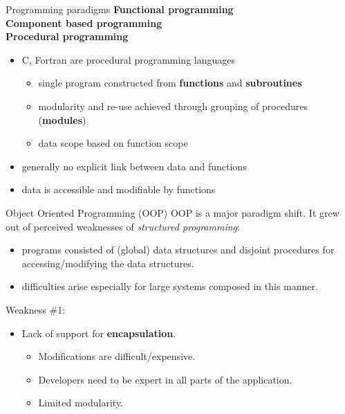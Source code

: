 \documentclass[11pt]{beamer}
\begin{document}
\begin{frame}{Programming paradigms}
\textbf{Functional programming}\\
\textbf{Component based programming}\\
\textbf{Procedural programming}
\begin{itemize}
  \item C, Fortran are procedural programming languages
\begin{itemize}
  \item single program constructed from \textbf{functions} and \textbf{subroutines}
 \item modularity and re-use achieved through grouping of procedures (\textbf{modules})
  \item data scope based on function scope
 \end{itemize}
 \item generally no explicit link between data and functions
  \item data is accessible and modifiable by functions
\end{itemize}

\end{frame}


\begin{frame}{Object Oriented Programming (OOP)}
OOP is a major paradigm shift. It grew out of perceived weaknesses of \emph{structured programming}:

\begin{itemize}
  \item programs consisted of (global) data structures and disjoint procedures for accessing/modifying the data structures.
  \item difficulties arise especially for large systems composed in this manner.
\end{itemize}
  
  Weakness \#1:
\begin{itemize}

  \item Lack of support for  \textbf{encapsulation}. 
  \begin{itemize}
  \item Modifications are difficult/expensive.
  \item Developers need to be expert in all parts of the application.
  \item Limited modularity.
  \end{itemize}

 \end{itemize}

\end{frame}
\end{document}
